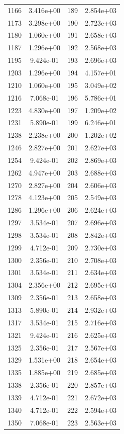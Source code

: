 \documentclass[12pt]{article}
\begin{document}
\begin{longtable}{@{}cccc@{}}
1166 & 3.416e+00 & 189 & 2.854e+03 \\
1173 & 3.298e+00 & 190 & 2.723e+03 \\
1180 & 1.060e+00 & 191 & 2.658e+03 \\
1187 & 1.296e+00 & 192 & 2.568e+03 \\
1195 & 9.424e-01 & 193 & 2.696e+03 \\
1203 & 1.296e+00 & 194 & 4.157e+01 \\
1210 & 1.060e+00 & 195 & 3.049e+02 \\
1216 & 7.068e-01 & 196 & 5.786e+01 \\
1223 & 4.830e+00 & 197 & 1.209e+02 \\
1231 & 5.890e-01 & 199 & 6.246e+01 \\
1238 & 2.238e+00 & 200 & 1.202e+02 \\
1246 & 2.827e+00 & 201 & 2.627e+03 \\
1254 & 9.424e-01 & 202 & 2.869e+03 \\
1262 & 4.947e+00 & 203 & 2.688e+03 \\
1270 & 2.827e+00 & 204 & 2.606e+03 \\
1278 & 4.123e+00 & 205 & 2.549e+03 \\
1286 & 1.296e+00 & 206 & 2.624e+03 \\
1297 & 3.534e-01 & 207 & 2.696e+03 \\
1298 & 3.534e-01 & 208 & 2.842e+03 \\
1299 & 4.712e-01 & 209 & 2.730e+03 \\
1300 & 2.356e-01 & 210 & 2.708e+03 \\
1301 & 3.534e-01 & 211 & 2.634e+03 \\
1304 & 2.356e+00 & 212 & 2.695e+03 \\
1309 & 2.356e-01 & 213 & 2.658e+03 \\
1313 & 5.890e-01 & 214 & 2.932e+03 \\
1317 & 3.534e-01 & 215 & 2.716e+03 \\
1321 & 9.424e-01 & 216 & 2.625e+03 \\
1325 & 2.356e-01 & 217 & 2.567e+03 \\
1329 & 1.531e+00 & 218 & 2.654e+03 \\
1335 & 1.885e+00 & 219 & 2.685e+03 \\
1338 & 2.356e-01 & 220 & 2.857e+03 \\
1339 & 4.712e-01 & 221 & 2.672e+03 \\
1340 & 4.712e-01 & 222 & 2.594e+03 \\
1350 & 7.068e-01 & 223 & 2.563e+03 \\

\end{longtable}
\end{document}
